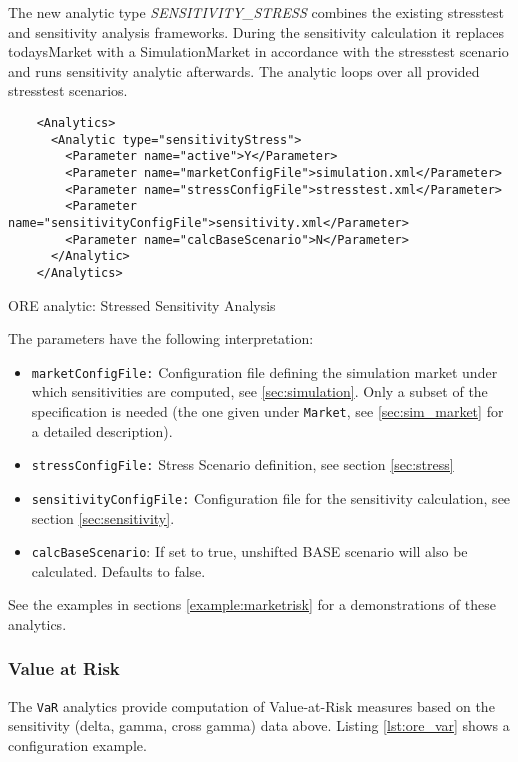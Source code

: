{The new analytic type \emph{SENSITIVITY\_STRESS} combines the existing stresstest and sensitivity analysis frameworks. During the sensitivity calculation it replaces todaysMarket with a SimulationMarket in accordance with the stresstest scenario and runs sensitivity analytic afterwards. The analytic loops over all provided stresstest scenarios.

\begin{listing}[H]
  \begin{verbatim}
    <Analytics>
      <Analytic type="sensitivityStress">
        <Parameter name="active">Y</Parameter>
        <Parameter name="marketConfigFile">simulation.xml</Parameter>
        <Parameter name="stressConfigFile">stresstest.xml</Parameter>
        <Parameter name="sensitivityConfigFile">sensitivity.xml</Parameter>
        <Parameter name="calcBaseScenario">N</Parameter>
      </Analytic>
    </Analytics>
  \end{verbatim}
  \caption{ORE analytic: Stressed Sensitivity Analysis}
  \label{lst:ore_sensistress}
  \end{listing}

The parameters have the following interpretation:

\begin{itemize}
  \item {\tt marketConfigFile:} Configuration file defining the simulation market under which sensitivities are computed,
    see \ref{sec:simulation}. Only a subset of the specification is needed (the one given under {\tt Market}, see
    \ref{sec:sim_market} for a detailed description).
  \item {\tt stressConfigFile:} Stress Scenario definition, see section \ref{sec:stress}
  \item {\tt sensitivityConfigFile:} Configuration file  for the sensitivity calculation, see section \ref{sec:sensitivity}.
  \item {\tt calcBaseScenario}: If set to true, unshifted BASE scenario will also be calculated. Defaults to false.
\end{itemize}

See the examples in sections \ref{example:marketrisk} for a demonstrations of these analytics.

\subsubsection{Value at Risk}

The {\tt VaR} analytics provide computation of Value-at-Risk measures based on the sensitivity (delta, gamma, cross gamma) data above. Listing \ref{lst:ore_var} shows a configuration example.

}
